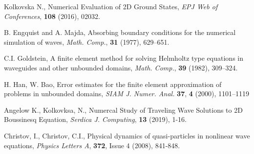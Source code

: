 \documentclass[a5paper]{article}
\theoremstyle{remark}
\begin{document}
\begin{normalsize}
\begin{thebibliography}{99}
	 Kolkovska N., Numerical Evaluation of 2D Ground States,
\emph{ EPJ Web of Conferences}, \textbf{108} (2016), 02032.

	 B. Engquist and A. Majda, Absorbing boundary conditions for the numerical simulation of waves, {\it Math. Comp.}, \textbf{31} (1977), 629–651.

	 C.I. Goldstein, A finite element method for solving Helmholtz type equations in waveguides and other unbounded domains,
{\it Math. Comp.}, \textbf{39} (1982), 309–324.

	 H. Han, W. Bao, Error estimates for the finite element approximation of problems in unbounded domains,
{\it SIAM J. Numer. Anal.} \textbf{37}, \textbf{4} (2000), 1101–1119

	 Angelow K., Kolkovksa, N., Numercal Study of Traveling Wave Solutions to 2D Boussinesq Equation, {\it Serdica J. Computing}, \textbf{13} (2019), 1-16.

	 Christov, I., Christov, C.I., Physical dynamics of quasi-particles in nonlinear wave equations,
{\it Physics Letters A}, \textbf{372}, Issue 4 (2008),  841-848.


\end{thebibliography}
\end{normalsize}
\end{document}
